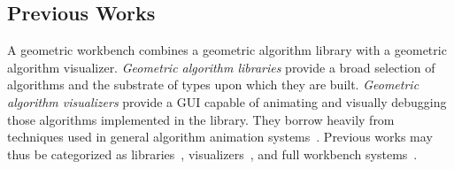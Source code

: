 
\subsection{Previous Works}

A geometric workbench combines a geometric algorithm library with a geometric
algorithm visualizer. \emph{Geometric algorithm libraries} provide a broad
selection of algorithms and the substrate of types upon which they are built.
\emph{Geometric algorithm visualizers} provide a GUI capable of animating and
visually debugging those algorithms implemented in the library. They borrow
heavily from techniques used in general algorithm animation
systems~\cite{brown1984system, stasko1990tango, stasko1995polka,
stasko1995samba}. Previous works may thus be categorized as
libraries~\cite{mehlhorn1989leda, fabri1998design, overmars1996designing,
fabri1996cgal}, visualizers~\cite{phillips1993geomview, hanson1994interactive,
amenta1995geomview, basken2002geowin}, and full workbench
systems~\cite{schorn1991robust, de1993geolab, de1993animation,
epstein1994workbench, tal1995visualization, shneerson1997gasp,
wei2009geobuilder}.

